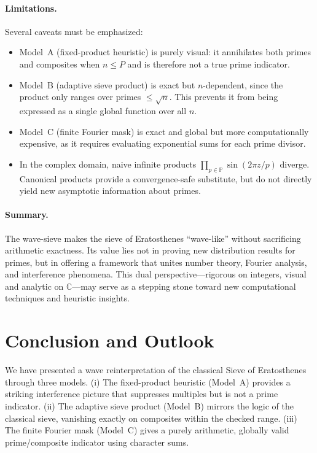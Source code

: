 \documentclass[12pt]{article}
\theoremstyle{definition}
\theoremstyle{remark}
\newcommand{\C}{\mathbb{C}}
\newcommand{\Primes}{\mathbb{P}}
\begin{document}
\paragraph{Limitations.}  
Several caveats must be emphasized:
\begin{itemize}
  \item Model~A (fixed-product heuristic) is purely visual: it annihilates both primes and composites when $n\le P$ and is therefore not a true prime indicator.
  \item Model~B (adaptive sieve product) is exact but $n$-dependent, since the product only ranges over primes $\le \sqrt{n}$. This prevents it from being expressed as a single global function over all $n$.
  \item Model~C (finite Fourier mask) is exact and global but more computationally expensive, as it requires evaluating exponential sums for each prime divisor.
  \item In the complex domain, naive infinite products $\prod_{p\in \Primes} \sin(2\pi z/p)$ diverge. Canonical products provide a convergence-safe substitute, but do not directly yield new asymptotic information about primes.
\end{itemize}

\paragraph{Summary.}  
The wave-sieve makes the sieve of Eratosthenes “wave-like” without sacrificing arithmetic exactness. Its value lies not in proving new distribution results for primes, but in offering a framework that unites number theory, Fourier analysis, and interference phenomena. This dual perspective—rigorous on integers, visual and analytic on $\C$—may serve as a stepping stone toward new computational techniques and heuristic insights.

\section{Conclusion and Outlook}

We have presented a wave reinterpretation of the classical Sieve of Eratosthenes through three models.  
(i) The fixed-product heuristic (Model~A) provides a striking interference picture that suppresses multiples but is not a prime indicator.  
(ii) The adaptive sieve product (Model~B) mirrors the logic of the classical sieve, vanishing exactly on composites within the checked range.  
(iii) The finite Fourier mask (Model~C) gives a purely arithmetic, globally valid prime/composite indicator using character sums.  
\end{document}
